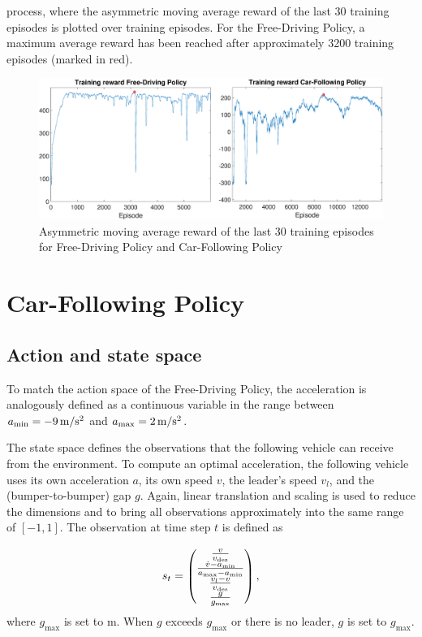 \documentclass[review]{elsarticle}
\providecommand{\sub}[1]{_{\mathrm{#1}}}  %
\providecommand{\3}{{\ss}}
\begin{document}
process, where the asymmetric moving average reward of the last 30 training episodes is plotted over training episodes. For the Free-Driving Policy, a maximum average reward has been reached after approximately 3200 training episodes (marked in red).
%
\begin{figure}
	\centering
	\includegraphics[width=12cm]{images/TrainingReward}
	\caption{Asymmetric moving average reward of the last 30 training episodes for Free-Driving Policy and Car-Following Policy} 
	\label{fig:TrainingReward}
\end{figure}


\section{Car-Following Policy}
\label{sec:CarFollowingPolicy}
\subsection{Action and state space}
\label{stateSpaceFollow}
To match the action space of the Free-Driving Policy, the acceleration is analogously defined as a continuous variable in the range between $a\sub{\rm min} = \unit[-9]{m/s^2}$ and 
$a\sub{\rm max} =\unit[2]{m/s^2}$.


The state space defines the observations that the following
vehicle can receive from the environment. To compute an optimal
acceleration, the following vehicle uses its own acceleration $a$,
its own speed $v$, the leader's speed $v_l$,
and the (bumper-to-bumper) gap $g$.
 Again, linear translation and scaling is used
to reduce the dimensions and to bring all observations approximately
into the same range of $[-1,1]$. The observation at time step $t$ is defined as

\begin{equation}
\label{eq:stateFollow}
s_t = 
\begin{pmatrix} 
\frac{v}{v\sub{des}} \\ 
\frac{\dot{v}-a\sub{\rm min}}{a\sub{\rm max} - a\sub{\rm min}}\\
\frac{v_l-v}{v\sub{des}}\\
\frac{g}{g\sub{\rm max}}

\end{pmatrix},
\end{equation}
%
where $g\sub{max}$ is set to  \unit[200]{m}. When $g$ exceeds  $g\sub{max}$ or there is no leader, $g$ is set to  $g\sub{max}$.
\end{document}

